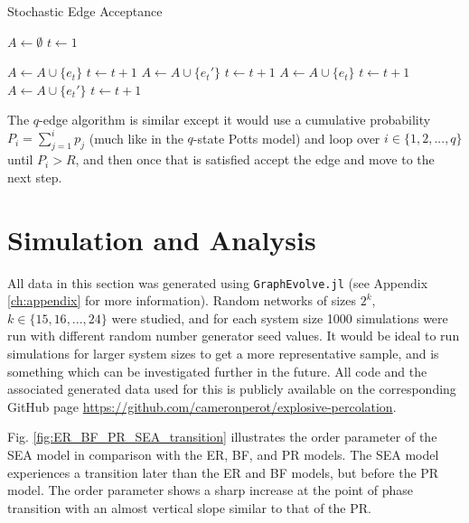 \begin{algorithm}[H]
	\caption{Stochastic Edge Acceptance}\label{Stochastic-Edge-Acceptance}
	\begin{algorithmic}[1]
		\State $A \gets \emptyset$
		\State $t \gets 1$

				\State $A \gets A \cup \{e_t\}$
				\State $t \gets t+1$
				\State $A \gets A \cup \{e_t'\}$
				\State $t \gets t+1$
				\State $A \gets A \cup \{e_t\}$
				\State $t \gets t+1$
			\Else
				\State $A \gets A \cup \{e_t'\}$
				\State $t \gets t+1$
			\EndIf
		\EndWhile
	\EndProcedure
	\end{algorithmic}
\end{algorithm}

The $q$-edge algorithm is similar except it would use a cumulative probability $P_i = \sum\limits_{j=1}^{i} p_j$ (much like in the $q$-state Potts model) and loop over $i \in \{1, 2, ..., q\}$ until $P_i > R$, and then once that is satisfied accept the edge and move to the next step.



\section{Simulation and Analysis}
All data in this section was generated using \texttt{GraphEvolve.jl} (see Appendix \ref{ch:appendix} for more information).
Random networks of sizes $2^k$, $k \in \{15, 16, ..., 24\}$ were studied, and for each system size 1000 simulations were run with different random number generator seed values.
It would be ideal to run simulations for larger system sizes to get a more representative sample, and is something which can be investigated further in the future.
All code and the associated generated data used for this is publicly available on the corresponding GitHub page \url{https://github.com/cameronperot/explosive-percolation}.

Fig. \ref{fig:ER_BF_PR_SEA_transition} illustrates the order parameter of the SEA model in comparison with the ER, BF, and PR models.
The SEA model experiences a transition later than the ER and BF models, but before the PR model.
The order parameter shows a sharp increase at the point of phase transition with an almost vertical slope similar to that of the PR.

